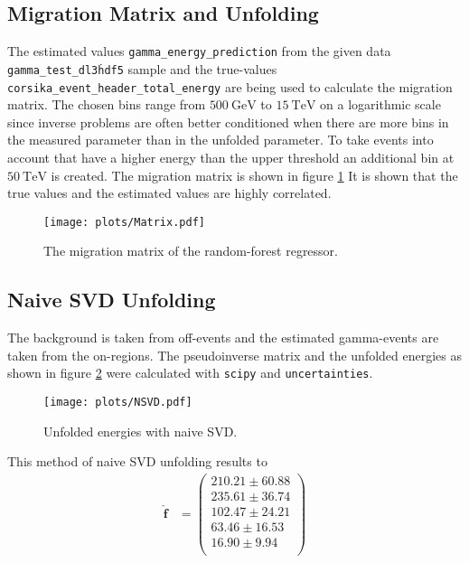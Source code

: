 \subsection{Migration Matrix and Unfolding}
The estimated values \texttt{gamma\_energy\_prediction} from the given data \texttt{gamma\_test\_dl3\.hdf5}
sample and the true-values \texttt{corsika\_event\_header\_total\_energy} are being used to calculate the migration matrix.
The chosen bins range from $\SI{500}{\giga\electronvolt}$ to $\SI{15}{\tera\electronvolt}$ on a logarithmic scale since inverse problems are often better conditioned when there are more bins in the measured parameter than in the unfolded parameter.
To take events into account that have a higher energy than the upper threshold an additional bin at $\SI{50}{\tera\electronvolt}$  is created.
The migration matrix is shown in figure \ref{fig:matrix}
It is shown that the true values and the estimated values are highly correlated.

\begin{figure}[H]
  \centering
  \texttt{[image: plots/Matrix.pdf]}
  \caption{The migration matrix of the random-forest regressor.}
  \label{fig:matrix}
\end{figure}

\subsection{Naive SVD Unfolding}
The background is taken from off-events and the estimated gamma-events are taken from the on-regions.
The pseudoinverse matrix and the unfolded energies as shown in figure \ref{fig:NSVD} were calculated with \texttt{scipy} and \texttt{uncertainties}.

\begin{figure}[H]
  \centering
  \texttt{[image: plots/NSVD.pdf]}
  \caption{Unfolded energies with naive SVD.}
  \label{fig:NSVD}
\end{figure}

This method of naive SVD unfolding results to
\begin{align}
\hat{\symbf{f}} &=
\begin{pmatrix}
     210.21 \pm 60.88 \\
     235.61 \pm 36.74 \\
     102.47 \pm 24.21 \\
     63.46 \pm 16.53 \\
     16.90 \pm 9.94 \\
\end{pmatrix}
\end{align}

